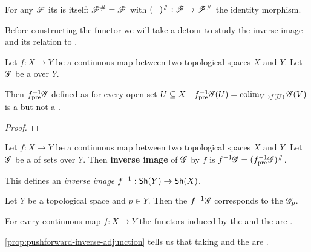 \documentclass[../main.tex]{subfiles}
\begin{document}
\begin{example}
  For any  \(\mathscr{F}\) its  is itself: \(\mathscr{F}^{\#} = \mathscr{F}\) with \((-)^{\#}: \mathscr{F} \to \mathscr{F}^{\#}\) the identity morphism.
\end{example}

Before constructing the  functor we will take a detour to study the inverse image  and its relation to .

\begin{lemma}
  Let \(f: X \to Y\) be a continuous map between two topological spaces \(X\) and \(Y\).
  Let \(\mathscr{G}\) be a  over \(Y\).

  Then \(f_{\operatorname*{pre}}^{-1}\mathscr{G}\) defined as for every open set \(U \subseteq X \quad f_{\operatorname*{pre}}^{-1}\mathscr{G}(U) = \operatorname*{colim}_{V \supset f(U)} \mathscr{G}(V)\) is a  but not a .
\end{lemma}
\begin{proof}
\end{proof}


\begin{definition} \label{def:inverse-image-sheaf}
  Let \(f: X \to Y\) be a continuous map between two topological spaces \(X\) and \(Y\).
  Let \(\mathscr{G}\) be a  of sets over \(Y\).
  Then \textbf{inverse image}  of \(\mathscr{G}\) by \(f\) is \(f^{-1}\mathscr{G} = (f_{\operatorname*{pre}}^{-1}\mathscr{G})^{\#}\).

  This defines an \textit{inverse image } \(f^{-1}: \mathsf{Sh}(Y) \to \mathsf{Sh}(X)\).
\end{definition}

\begin{example}
  Let \(Y\) be a topological space and \(p \in Y\).
  Then the  \(f^{-1}\mathscr{G}\) corresponds to the  \(\mathscr{G}_{p}\).
\end{example}

\begin{proposition} \label{prop:pushforward-inverse-adjunction}
  For every continuous map \(f: X \to Y\) the functors induced by the  and the  are .
\end{proposition}

\begin{remark}
  \autoref{prop:pushforward-inverse-adjunction} tells us that taking  and the  are  .
\end{remark}
\end{document}
